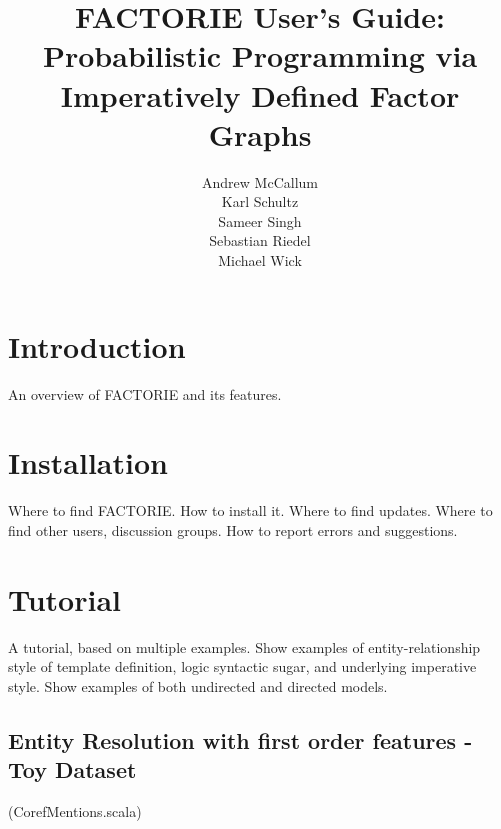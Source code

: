 \documentclass[]{manual}
\title{FACTORIE User's Guide:\\
Probabilistic Programming via Imperatively Defined Factor Graphs}
\author{Andrew McCallum \\ Karl Schultz \\ Sameer Singh \\ Sebastian Riedel \\ Michael Wick}
\begin{document}
\maketitle

\tableofcontents


\chapter{Introduction}
\label{chap:intro}

An overview of FACTORIE and its features.

\chapter{Installation}
\label{chap:install}

Where to find FACTORIE.  How to install it.  Where to find updates.
Where to find other users, discussion groups.  How to report errors
and suggestions.


\chapter{Tutorial}
\label{chap:tutorial}

A tutorial, based on multiple examples.  Show examples of
entity-relationship style of template definition, logic syntactic
sugar, and underlying imperative style.  Show examples of both
undirected and directed models.


\section{Entity Resolution with first order features - Toy Dataset}
(CorefMentions.scala)

\end{document}
